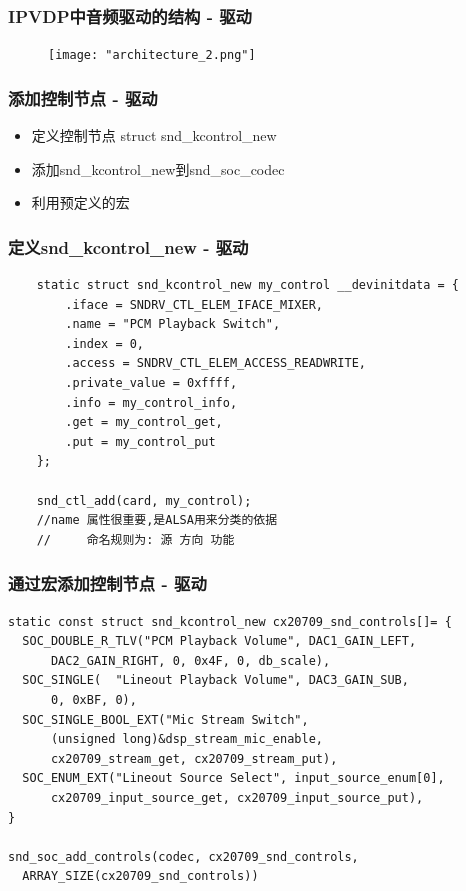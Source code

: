 \documentclass[CJK]{beamer}
\begin{document}
\begin{frame}[t]
    \frametitle{IPVDP中音频驱动的结构 - 驱动}
    \begin{figure}
        \texttt{[image: "architecture\_2.png"]}
    \end{figure}
\end{frame}

\begin{frame}
    \frametitle{添加控制节点 - 驱动}
    \begin{itemize}
        \item 定义控制节点 struct snd\_kcontrol\_new
        \item 添加snd\_kcontrol\_new到snd\_soc\_codec
        \item 利用预定义的宏
    \end{itemize}
\end{frame}

\begin{frame}[fragile]
    \frametitle{定义snd\_kcontrol\_new - 驱动}
    \begin{verbatim}
    static struct snd_kcontrol_new my_control __devinitdata = {  
        .iface = SNDRV_CTL_ELEM_IFACE_MIXER,  
        .name = "PCM Playback Switch",  
        .index = 0,  
        .access = SNDRV_CTL_ELEM_ACCESS_READWRITE,  
        .private_value = 0xffff,  
        .info = my_control_info,  
        .get = my_control_get,  
        .put = my_control_put  
    };

    snd_ctl_add(card, my_control);
    //name 属性很重要,是ALSA用来分类的依据
    //     命名规则为: 源 方向 功能
    \end{verbatim}
\end{frame}

\begin{frame}[fragile]
    \frametitle{通过宏添加控制节点 - 驱动}
    \begin{verbatim}
static const struct snd_kcontrol_new cx20709_snd_controls[]= {
  SOC_DOUBLE_R_TLV("PCM Playback Volume", DAC1_GAIN_LEFT,	
      DAC2_GAIN_RIGHT, 0, 0x4F, 0, db_scale),
  SOC_SINGLE(  "Lineout Playback Volume", DAC3_GAIN_SUB,		 
      0, 0xBF, 0),
  SOC_SINGLE_BOOL_EXT("Mic Stream Switch", 
      (unsigned long)&dsp_stream_mic_enable, 
      cx20709_stream_get, cx20709_stream_put),
  SOC_ENUM_EXT("Lineout Source Select", input_source_enum[0],
      cx20709_input_source_get, cx20709_input_source_put),
}

snd_soc_add_controls(codec, cx20709_snd_controls, 
  ARRAY_SIZE(cx20709_snd_controls))

    \end{verbatim}
\end{frame}
\end{document}
